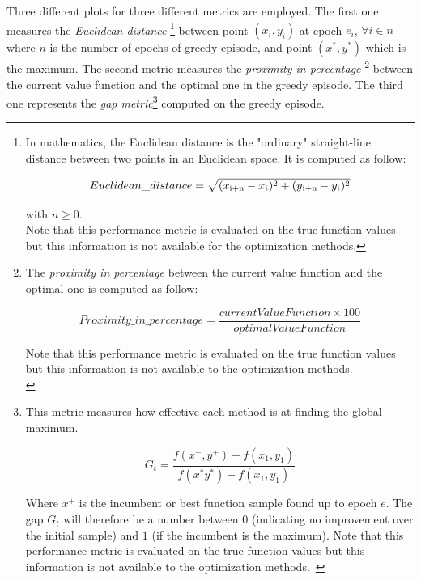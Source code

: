 Three different plots for three different metrics are employed. The first one measures the \textit{Euclidean distance} \footnote{In mathematics, the Euclidean distance is the "ordinary" straight-line distance between two points in an Euclidean space. It is computed as follow: 
	
	\begin{equation}
		Euclidean\_distance = \sqrt{(x\textsubscript{i+n} - x_i)^2 + (y\textsubscript{i+n} - y_i)^2}
	\end{equation}

with $n \ge 0$. \\
	
Note that this performance metric is evaluated on the true function values but this information is not available for the optimization methods.} between point $(x_i, y_i)$ at epoch $e_i$, $\forall i \in n$ where $n$ is the number of epochs of greedy episode, and point $(x^*, y^*)$ which is the maximum. The second metric measures the \textit{proximity in percentage} \footnote{The \textit{proximity in percentage} between the current value function and the optimal one is computed as follow:

\begin{equation}
Proximity\_in\_ percentage = \frac{currentValueFunction \times 100}{optimalValueFunction}
\end{equation}

Note that this performance metric is evaluated on the true function values but this information is not available to the optimization methods. \\ } between the current value function and the optimal one in the greedy episode. The third one represents the \textit{gap metric}\footnote{This metric measures how effective each method is at finding the global maximum.

\begin{equation}
G_t = \dfrac{f(x^+, y^+) - f(x_1, y_1)}{f(x^* y^*) - f(x_1, y_1)}
\end{equation}

Where $x^+$ is the incumbent or best function sample found up to epoch $e$. The gap $G_t$ will therefore be a number between $0$ (indicating no improvement over the initial sample) and $1$ (if the incumbent is the maximum). Note that this performance metric is evaluated on the true function values but this information is not available to the optimization methods.~\cite{Hoffman:2011:PAB:3020548.3020587}} computed on the greedy episode.


